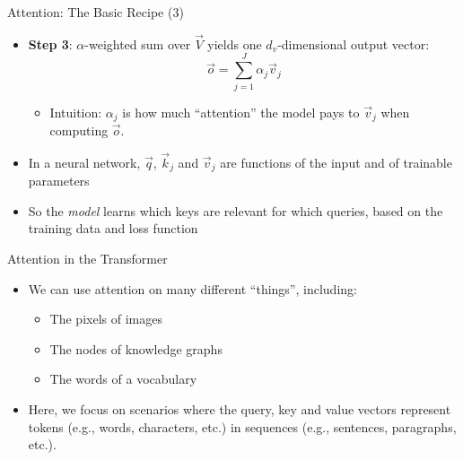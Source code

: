 \begin{vbframe}{Attention: The Basic Recipe (3)}

\vfill

\begin{itemize}
	\item \textbf{Step 3}: $\alpha$-weighted sum over $\vec {V}$ yields one $d_v$-dimensional output vector:
	$$\vec {o} = \sum_{j=1}^J \alpha_j \vec {v}_j$$
		\begin{itemize}
			\item Intuition: $\alpha_j$ is how much ``attention'' the model pays to $\vec v_j$ when computing $\vec o$.
		\end{itemize}
	\item In a neural network, $\vec q$, $\vec k_j$ and $\vec v_j$ are functions of the input and of trainable parameters
	\item So the \textit{model} learns which keys are relevant for which queries, based on the training data and loss function
\end{itemize}

\vfill

\end{vbframe}

\begin{vbframe}{Attention in the Transformer}

\vfill

\begin{itemize}
\item We can use attention on many different ``things'', including:
\begin{itemize}
\item The pixels of images
\item The nodes of knowledge graphs
\item The words of a vocabulary
\end{itemize}
\item Here, we focus on scenarios where the query, key and value vectors represent tokens (e.g., words, characters, etc.) in sequences (e.g., sentences, paragraphs, etc.).
\end{itemize}

\vfill

\end{vbframe}

